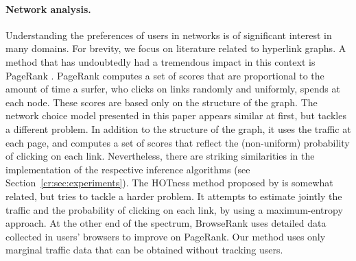 \paragraph{Network analysis.}
Understanding the preferences of users in networks is of significant interest in many domains.
For brevity, we focus on literature related to hyperlink graphs.
A method that has undoubtedly had a tremendous impact in this context is PageRank \citep{brin1998anatomy}.
PageRank computes a set of scores that are proportional to the amount of time a surfer, who clicks on links randomly and uniformly, spends at each node.
These scores are based only on the structure of the graph.
The network choice model presented in this paper appears similar at first, but tackles a different problem.
In addition to the structure of the graph, it uses the traffic at each page, and computes a set of scores that reflect the (non-uniform) probability of clicking on each link.
Nevertheless, there are striking similarities in the implementation of the respective inference algorithms (see Section~\ref{cr:sec:experiments}).
The HOTness method proposed by \citet{tomlin2003new} is somewhat related, but tries to tackle a harder problem.
It attempts to estimate jointly the traffic and the probability of clicking on each link, by using a maximum-entropy approach.
At the other end of the spectrum, BrowseRank \citep{liu2008browserank} uses detailed data collected in users' browsers to improve on PageRank.
Our method uses only marginal traffic data that can be obtained without tracking users.
